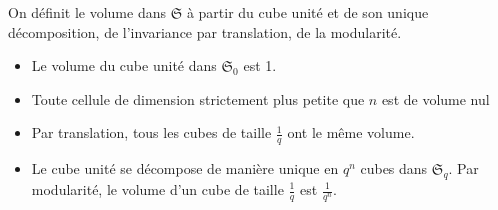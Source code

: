 \noindent On définit le volume dans $\mathfrak{S}$ à partir du cube unité et de son unique décomposition, de l'invariance par translation, de la modularité.
\begin{itemize}
 \item Le volume du cube unité dans $\mathfrak{S}_0$ est 1.
 \item Toute cellule de dimension strictement plus petite que $n$ est de volume nul
 \item Par translation, tous les cubes de taille $\frac{1}{q}$ ont le même volume.
 \item Le cube unité se décompose de manière unique en $q^{n}$ cubes dans $\mathfrak{S}_q$. Par modularité, le volume d'un cube de taille $\frac{1}{q}$ est $\frac{1}{q^{n}}$.
\end{itemize}


